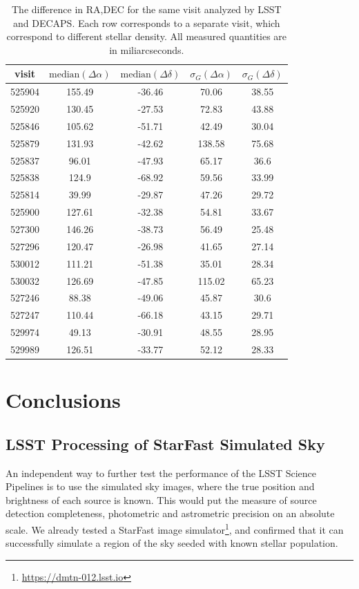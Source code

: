 \documentclass[DM,lsstdraft,toc,usenatbib]{lsstdoc}
\begin{document}
\begin{table}
\centering
\caption{The difference in RA,DEC for the same visit analyzed by LSST and DECAPS.  Each row corresponds to a separate visit, which correspond to different stellar density.  All  measured quantities are in miliarcseconds. }
\label{tab:radec_lsst_decaps}
\begin{tabular}{ccccc}
visit & $\mathrm{median}(\Delta\alpha)$ & $\mathrm{median}(\Delta\delta)$ & $\sigma_{G}(\Delta\alpha)$ & $\sigma_{G}(\Delta\delta)$ \\
\hline
525904 & 155.49 & -36.46 & 70.06 & 38.55 \\
525920 & 130.45 & -27.53 & 72.83 & 43.88 \\
525846 & 105.62 & -51.71 & 42.49 & 30.04 \\
525879 & 131.93 & -42.62 & 138.58 & 75.68 \\
525837 & 96.01 & -47.93 & 65.17 & 36.6 \\
525838 & 124.9 & -68.92 & 59.56 & 33.99 \\
525814 & 39.99 & -29.87 & 47.26 & 29.72 \\
525900 & 127.61 & -32.38 & 54.81 & 33.67 \\
527300 & 146.26 & -38.73 & 56.49 & 25.48 \\
527296 & 120.47 & -26.98 & 41.65 & 27.14 \\
530012 & 111.21 & -51.38 & 35.01 & 28.34 \\
530032 & 126.69 & -47.85 & 115.02 & 65.23 \\
527246 & 88.38 & -49.06 & 45.87 & 30.6 \\
527247 & 110.44 & -66.18 & 43.15 & 29.71 \\
529974 & 49.13 & -30.91 & 48.55 & 28.95 \\
529989 & 126.51 & -33.77 & 52.12 & 28.33 \\
\end{tabular}
\end{table}




\section{Conclusions}
\label{sec:conclusions}


\subsection{LSST Processing of StarFast Simulated Sky}
An independent way to further test the performance of the LSST Science Pipelines is to use the simulated sky images, where the true position and  brightness of each source is known. This would put the measure of source detection completeness, photometric and astrometric precision on an absolute scale. We already tested a StarFast image simulator\footnote{\url{https://dmtn-012.lsst.io}}, and confirmed that it can successfully simulate a region of the sky seeded with known stellar population.  
\end{document}
